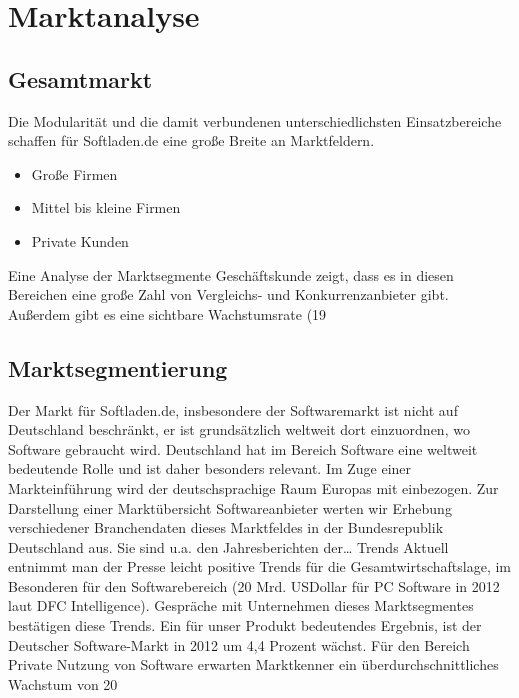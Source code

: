 \chapter{Marktanalyse}
\section{Gesamtmarkt}
Die Modularität und die damit verbundenen unterschiedlichsten Einsatzbereiche schaffen
für Softladen.de eine große Breite an Marktfeldern.
\begin{itemize}
	\item Große Firmen
	\item Mittel bis kleine Firmen
	\item Private Kunden
\end{itemize}
Eine Analyse der Marktsegmente Geschäftskunde zeigt, dass es in diesen Bereichen eine große Zahl von Vergleichs- und Konkurrenzanbieter gibt. Außerdem gibt es eine sichtbare Wachstumsrate (19%
\section{Marktsegmentierung}
Der Markt für Softladen.de, insbesondere der Softwaremarkt ist nicht auf Deutschland beschränkt, er ist grundsätzlich weltweit dort einzuordnen, wo Software gebraucht wird. Deutschland hat im Bereich Software eine weltweit bedeutende Rolle und ist daher besonders relevant. Im Zuge einer Markteinführung wird der deutschsprachige Raum Europas mit einbezogen. Zur Darstellung einer Marktübersicht Softwareanbieter werten wir Erhebung verschiedener Branchendaten dieses Marktfeldes in der Bundesrepublik Deutschland aus. Sie sind u.a.
den Jahresberichten der…
Trends
Aktuell entnimmt man der Presse leicht positive Trends für die Gesamtwirtschaftslage, im Besonderen für den Softwarebereich (20 Mrd. USDollar für PC Software in 2012 laut DFC Intelligence). Gespräche mit Unternehmen dieses Marktsegmentes bestätigen diese Trends. Ein für unser Produkt bedeutendes Ergebnis, ist der Deutscher Software-Markt in 2012 um 4,4 Prozent wächst. Für den Bereich Private Nutzung von Software erwarten Marktkenner ein überdurchschnittliches Wachstum von 20%

